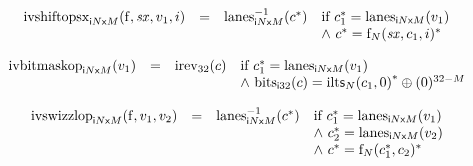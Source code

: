 $$
\begin{array}[t]{@{}lcl@{}l@{}}
{{\mathrm{ivshiftopsx}}}_{{{\mathsf{i}}{N}}{\mathsf{x}}{M}}({\mathrm{f}}, {\mathit{sx}}, v_1, i) & = & {{{{\mathrm{lanes}}}_{{{\mathsf{i}}{N}}{\mathsf{x}}{M}}^{{-1}}}}{({c^\ast})} & \quad
\begin{array}[t]{@{}l@{}}
\mbox{if}~ {c_1^\ast} = {{\mathrm{lanes}}}_{{{\mathsf{i}}{N}}{\mathsf{x}}{M}}(v_1) \\
{\land}~ {c^\ast} = {{{\mathrm{f}}}_{N}({\mathit{sx}}, c_1, i)^\ast} \\
\end{array} \\
\end{array}
$$

\vspace{1ex}

$$
\begin{array}[t]{@{}lcl@{}l@{}}
{{\mathrm{ivbitmaskop}}}_{{{\mathsf{i}}{N}}{\mathsf{x}}{M}}(v_1) & = & {{\mathrm{irev}}}_{32}(c) & \quad
\begin{array}[t]{@{}l@{}}
\mbox{if}~ {c_1^\ast} = {{\mathrm{lanes}}}_{{{\mathsf{i}}{N}}{\mathsf{x}}{M}}(v_1) \\
{\land}~ {{\mathrm{bits}}}_{{\mathsf{i}}{32}}(c) = {{{\mathrm{ilt}}}{\mathsf{s}}{{}_{N}(c_1, 0)}^\ast} \oplus {(0)^{32 - M}} \\
\end{array} \\
\end{array}
$$

\vspace{1ex}

$$
\begin{array}[t]{@{}lcl@{}l@{}}
{{\mathrm{ivswizzlop}}}_{{{\mathsf{i}}{N}}{\mathsf{x}}{M}}({\mathrm{f}}, v_1, v_2) & = & {{{{\mathrm{lanes}}}_{{{\mathsf{i}}{N}}{\mathsf{x}}{M}}^{{-1}}}}{({c^\ast})} & \quad
\begin{array}[t]{@{}l@{}}
\mbox{if}~ {c_1^\ast} = {{\mathrm{lanes}}}_{{{\mathsf{i}}{N}}{\mathsf{x}}{M}}(v_1) \\
{\land}~ {c_2^\ast} = {{\mathrm{lanes}}}_{{{\mathsf{i}}{N}}{\mathsf{x}}{M}}(v_2) \\
{\land}~ {c^\ast} = {{{\mathrm{f}}}_{N}({c_1^\ast}, c_2)^\ast} \\
\end{array} \\
\end{array}
$$

\vspace{1ex}

